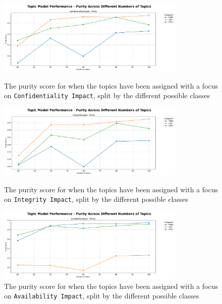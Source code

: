 \documentclass[12pt]{article}
\begin{document}
\begin{figure}[h!]
	\centering

	\begin{minipage}[t]{\textwidth}
		\centering
		\includegraphics[width=0.8\textwidth]{figures/purity/topic_model_performance_purity_ground_truth_confidentialityImpact.pdf}
		\caption{The purity score for when the topics have been assigned with a focus on \texttt{Confidentiality Impact}, split by the different possible classes}
		\label{fig:purity_20_confidentiality}
	\end{minipage}

	\begin{minipage}[t]{\textwidth}
		\centering
		\includegraphics[width=0.8\textwidth]{figures/purity/topic_model_performance_purity_ground_truth_integrityImpact.pdf}
		\caption{The purity score for when the topics have been assigned with a focus on \texttt{Integrity Impact}, split by the different possible classes}
		\label{fig:purity_integrity}
	\end{minipage}


	\begin{minipage}[t]{\textwidth}
		\centering
		\includegraphics[width=0.8\textwidth]{figures/purity/topic_model_performance_purity_ground_truth_availabilityImpact.pdf}
		\caption{The purity score for when the topics have been assigned with a focus on \texttt{Availability Impact}, split by the different possible classes}
		\label{fig:purity_20_availability}
	\end{minipage}


\end{figure}
\end{document}
